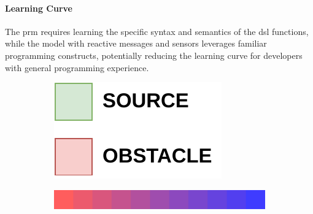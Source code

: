 \paragraph{Learning Curve}

The \ac{prm} requires learning the specific syntax and semantics of the \ac{dsl} functions, while the model with reactive messages and sensors leverages familiar programming constructs, potentially reducing the learning curve for developers with general programming experience.

\begin{figure}
    \centering
    \begin{subfigure}[b]{.15\textwidth}
        \centering
        \includegraphics[width=\textwidth]{figures/gradient-environment-legend.pdf}
        \label{fig:gradient-legend}
    \end{subfigure}
    \hfill
    \begin{subfigure}[b]{.49\textwidth}
        \centering
        \includegraphics[width=\textwidth]{figures/palette-cropped2.png}
        \label{fig:gradient-palette}
    \end{subfigure}
    \hfill
    \begin{subfigure}[b]{.49\textwidth}
        \centering

\end{subfigure}
\end{figure}

